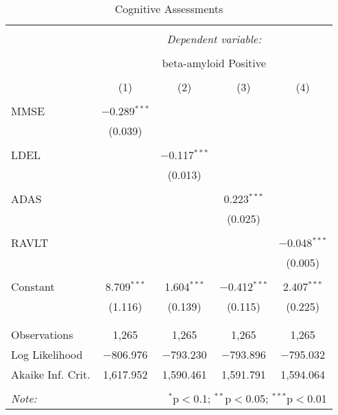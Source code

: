 
\begin{table}[!htbp] \centering 
  \caption{Cognitive Assessments} 
  \label{} 
\begin{tabular}{@{\extracolsep{5pt}}lcccc} 
\\[-1.8ex]\hline 
\hline \\[-1.8ex] 
 & \multicolumn{4}{c}{\textit{Dependent variable:}} \\ 
\cline{2-5} 
\\[-1.8ex] & \multicolumn{4}{c}{beta-amyloid Positive} \\ 
\\[-1.8ex] & (1) & (2) & (3) & (4)\\ 
\hline \\[-1.8ex] 
 MMSE & $-$0.289$^{***}$ &  &  &  \\ 
  & (0.039) &  &  &  \\ 
  & & & & \\ 
 LDEL &  & $-$0.117$^{***}$ &  &  \\ 
  &  & (0.013) &  &  \\ 
  & & & & \\ 
 ADAS &  &  & 0.223$^{***}$ &  \\ 
  &  &  & (0.025) &  \\ 
  & & & & \\ 
 RAVLT &  &  &  & $-$0.048$^{***}$ \\ 
  &  &  &  & (0.005) \\ 
  & & & & \\ 
 Constant & 8.709$^{***}$ & 1.604$^{***}$ & $-$0.412$^{***}$ & 2.407$^{***}$ \\ 
  & (1.116) & (0.139) & (0.115) & (0.225) \\ 
  & & & & \\ 
\hline \\[-1.8ex] 
Observations & 1,265 & 1,265 & 1,265 & 1,265 \\ 
Log Likelihood & $-$806.976 & $-$793.230 & $-$793.896 & $-$795.032 \\ 
Akaike Inf. Crit. & 1,617.952 & 1,590.461 & 1,591.791 & 1,594.064 \\ 
\hline 
\hline \\[-1.8ex] 
\textit{Note:}  & \multicolumn{4}{r}{$^{*}$p$<$0.1; $^{**}$p$<$0.05; $^{***}$p$<$0.01} \\ 
\end{tabular} 
\end{table} 
